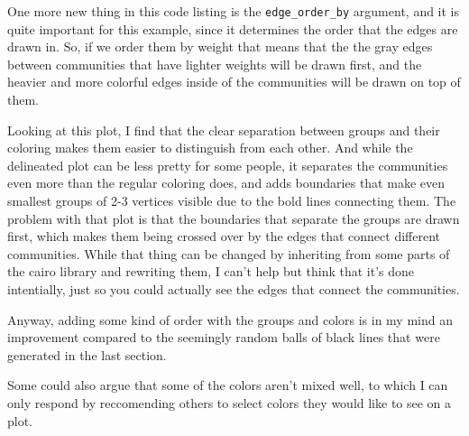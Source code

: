 \documentclass[12pt, a4paper]{article}
\begin{document}
One more new thing in this code listing is the \texttt{edge\_order\_by} argument, and it is quite important for this example, since it determines the order that the edges are drawn in. So, if we order them by weight that means that the the gray edges between communities that have lighter weights will be drawn first, and the heavier and more colorful edges inside of the communities will be drawn on top of them.





Looking at this plot, I find that the clear separation between groups and their coloring makes them easier to distinguish from each other. And while the delineated plot can be less pretty for some people, it separates the communities even more than the regular coloring does, and adds boundaries that make even smallest groups of 2-3 vertices visible due to the bold lines connecting them. The problem with that plot is that the boundaries that separate the groups are drawn first, which makes them being crossed over by the edges that connect different communities. While that thing can be changed by inheriting from some parts  of the cairo library and rewriting them, I can't help but think that it's done intentially, just so you could actually see the edges that connect the communities.

Anyway, adding some kind of order with the groups and colors is in my mind an improvement compared to the seemingly random balls of black lines that were generated in the last section.

Some could also argue that some of the colors aren't mixed well, to which I can only respond by reccomending others to select colors they would like to see on a plot.
\end{document}

